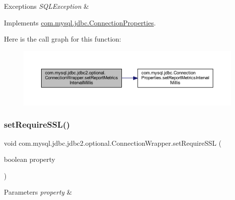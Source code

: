 \begin{DoxyExceptions}{Exceptions}
{\em S\+Q\+L\+Exception} & \\
\hline
\end{DoxyExceptions}


Implements \mbox{\hyperlink{interfacecom_1_1mysql_1_1jdbc_1_1_connection_properties_a98e28b386c63acdab88d1fdc0531d8ce}{com.\+mysql.\+jdbc.\+Connection\+Properties}}.

Here is the call graph for this function\+:
\nopagebreak
\begin{figure}[H]
\begin{center}
\leavevmode
\includegraphics[width=350pt]{classcom_1_1mysql_1_1jdbc_1_1jdbc2_1_1optional_1_1_connection_wrapper_ac30ff270089a0b4903332b4b6e3b2f2d_cgraph}
\end{center}
\end{figure}
\mbox{\label{classcom_1_1mysql_1_1jdbc_1_1jdbc2_1_1optional_1_1_connection_wrapper_a7aced035eee3e3d7402a549b608e391b}} 
\subsubsection{\texorpdfstring{set\+Require\+S\+S\+L()}{setRequireSSL()}}
{\footnotesize\ttfamily void com.\+mysql.\+jdbc.\+jdbc2.\+optional.\+Connection\+Wrapper.\+set\+Require\+S\+SL (\begin{DoxyParamCaption}\item[{boolean}]{property }\end{DoxyParamCaption})}


\begin{DoxyParams}{Parameters}
{\em property} & \\
\hline
\end{DoxyParams}


